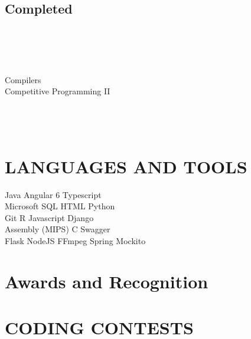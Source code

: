 \documentclass[]{deedy-resume-openfont}
\begin{document}
\begin{minipage}[t]{0.3\textwidth}
\subsection{Completed}
 \\
 \\
 \\
 \\
\textbullet{} Compilers \\
\textbullet{} Competitive Programming II \\
 \\
 \\
 \\
\sectionsep


\section{LANGUAGES AND TOOLS}
Java \textbullet{}Angular 6 \textbullet{} Typescript \\
Microsoft SQL \textbullet{} HTML \textbullet{}Python \\
Git \textbullet{} R \textbullet{} Javascript \textbullet{} Django 
\\
Assembly (MIPS) \textbullet{} C \textbullet{} Swagger 
\\
Flask \textbullet{} NodeJS \textbullet{} FFmpeg \textbullet{} Spring
Mockito


\section{Awards and Recognition} 



\section{CODING CONTESTS}


\end{minipage}
\end{document}
